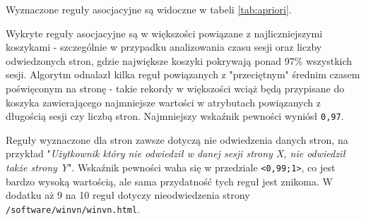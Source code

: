 \documentclass{classrep}
\begin{document}
\begin{table}[H]
\centering
\caption{Parametry przebiegu algorytmu Apriori dla flag stron}
\label{tab:apriori_equal_params}
\end{table}


Wyznaczone reguły asocjacyjne są widoczne w tabeli \ref{tab:apriori}.

Wykryte reguły asocjacyjne są w większości powiązane z najliczniejszymi koszykami - szczególnie w przypadku analizowania czasu sesji oraz liczby odwiedzonych stron, gdzie największe koszyki pokrywają ponad 97\% wszystkich sesji. Algorytm odnalazł kilka reguł powiązanych z "przeciętnym" średnim czasem poświęconym na stronę - takie rekordy w większości wciąż będą przypisane do koszyka zawierającego najmniejsze wartości w atrybutach powiązanych z długością sesji czy liczbą stron. Najmniejszy wskaźnik pewności wyniósł \verb|0,97|.

Reguły wyznaczone dla stron zawsze dotyczą nie odwiedzenia danych stron, na przykład "\textit{Użytkownik który nie odwiedził w danej sesji strony X, nie odwiedził także strony Y}". Wskaźnik pewności waha się w przedziale \verb|<0,99;1>|, co jest bardzo wysoką wartością, ale sama przydatność tych reguł jest znikoma. W dodatku aż 9 na 10 reguł dotyczy nieodwiedzenia strony \verb|/software/winvn/winvn.html|. 
\end{document}
